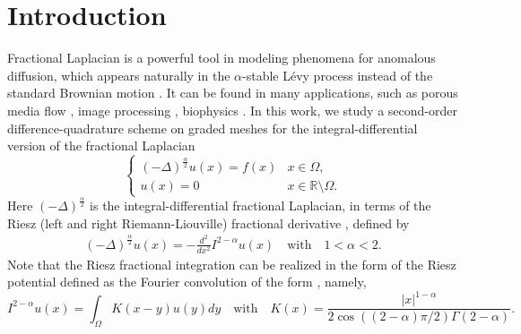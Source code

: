\documentclass{amsart}
\theoremstyle{definition}
\theoremstyle{remark}
\numberwithin{equation}{section}
\begin{document}
\linenumbers


\section{Introduction}
Fractional Laplacian is a powerful tool in modeling phenomena for anomalous diffusion, which appears naturally in the \(\alpha\)-stable L\'evy process instead of the standard Brownian motion %
\cite{ABBM2018,Bertoin:96,Getoor1961,MR2584076, MK:00}. It can be found in many applications, such as 
porous media flow \cite{MR2737788},
image processing \cite{MR3394445}, 
biophysics \cite{Andreu:10}.
In this work, we study a second-order difference-quadrature scheme on graded meshes for the integral-differential version of the   fractional Laplacian  
\begin{equation} \label{eq:equation}
  \begin{cases}
    (-\Delta)^{\frac{\alpha}{2}} u(x) = f(x) & x \in \Omega,                    \\
    u(x) = 0                                 & x \in \mathbb{R} \setminus \Omega.
  \end{cases}
\end{equation}
Here  $(-\Delta)^{\frac{\alpha}{2}}$ is the integral-differential   fractional Laplacian, in terms of the Riesz (left and right Riemann-Liouville) fractional derivative \cite{ABBM2018, HuangO:14, MR4043885,MR2796453}, defined by  
\begin{equation} \label{def:operator}
  \begin{split}  
      (-\Delta)^{\frac{\alpha}{2}} u(x) 
      = -\frac{d^2}{dx^2} I^{2-\alpha} u(x) 
      \quad  \text{with} \quad 1<\alpha<2.
  \end{split}
\end{equation}
Note that the Riesz fractional integration can be realized in the form of the Riesz potential
defined as the Fourier convolution of the form \cite[eq.\,(1.30)]{FractionalDynamics}, namely,
\begin{equation} \label{def:I2-a}
  I^{2-\alpha} u(x) = \int_{\Omega} K(x-y) u(y) dy 
  \quad \text{with} \quad 
  K(x) = \frac{|x|^{1-\alpha}}{2\cos((2-\alpha)\pi/2)\Gamma(2-\alpha)}
  .
\end{equation}
\end{document}
